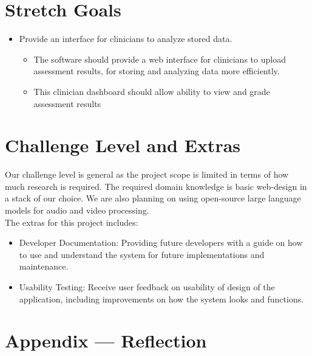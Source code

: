 \documentclass{article}
\begin{document}
\section{Stretch Goals}
\begin{itemize}
    \item Provide an interface for clinicians to analyze stored data.
    \begin{itemize}
        \item The software should provide a web interface for clinicians to upload assessment results, for storing and analyzing data more efficiently.\\
        \item This clinician dashboard should allow ability to view and grade assessment results
    \end{itemize}
\end{itemize}


\section{Challenge Level and Extras}

Our challenge level is general as the project scope is limited in terms of how much research is required. The required domain knowledge
is basic web-design in a stack of our choice. We are also planning on using open-source large language models for audio and video processing.\\
\indent The extras for this project includes:
\begin{itemize}
    \item Developer Documentation: Providing future developers with a guide on how to use and understand the system for future implementations and maintenance.
    \item Usability Testing: Receive user feedback on usability of design of the application, including improvements on how the system looks and functions.
\end{itemize}

\newpage{}

\section*{Appendix --- Reflection}


\end{document}
